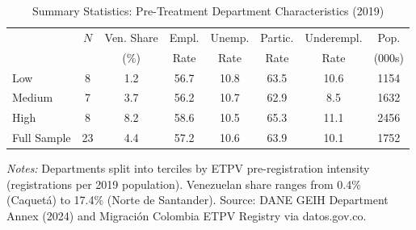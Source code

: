 \begin{table}[htbp]
\centering
\caption{Summary Statistics: Pre-Treatment Department Characteristics (2019)}
\label{tab:summary}
\begin{threeparttable}
\begin{tabular}{lccccccc}
\hline\hline
& $N$ & Ven. Share & Empl. & Unemp. & Partic. & Underempl. & Pop. \\
& & (\%) & Rate & Rate & Rate & Rate & (000s) \\
\hline
Low & 8 & 1.2 & 56.7 & 10.8 & 63.5 & 10.6 & 1154 \\
Medium & 7 & 3.7 & 56.2 & 10.7 & 62.9 & 8.5 & 1632 \\
High & 8 & 8.2 & 58.6 & 10.5 & 65.3 & 11.1 & 2456 \\
\hline
Full Sample & 23 & 4.4 & 57.2 & 10.6 & 63.9 & 10.1 & 1752 \\
\hline\hline
\end{tabular}
\begin{tablenotes}[flushleft]
\small
\item \textit{Notes:} Departments split into terciles by ETPV pre-registration intensity
(registrations per 2019 population). Venezuelan share ranges from 0.4\% (Caquet\'a) to
17.4\% (Norte de Santander). Source: DANE GEIH Department Annex (2024) and
Migraci\'on Colombia ETPV Registry via datos.gov.co.
\end{tablenotes}
\end{threeparttable}
\end{table}

